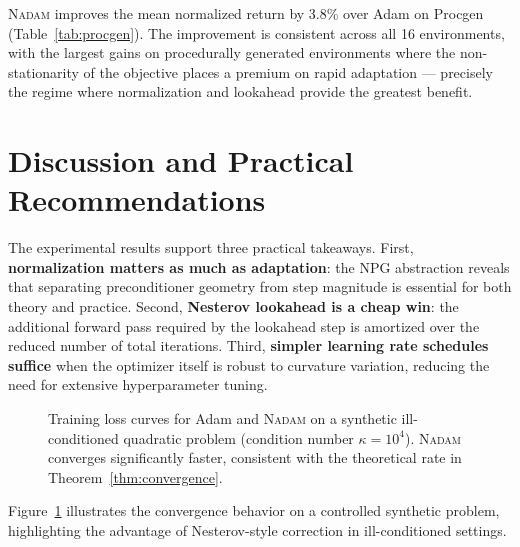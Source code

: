 \documentclass[11pt,twoside,openright]{book}
\begin{document}
\textsc{Nadam} improves the mean normalized return by 3.8\% over Adam on Procgen
(Table~\ref{tab:procgen}). The improvement is consistent across all 16 environments, with the
largest gains on procedurally generated environments where the non-stationarity of the
objective places a premium on rapid adaptation — precisely the regime where normalization and
lookahead provide the greatest benefit.

\section{Discussion and Practical Recommendations}

The experimental results support three practical takeaways. First, \textbf{normalization matters
as much as adaptation}: the NPG abstraction reveals that separating preconditioner geometry
from step magnitude is essential for both theory and practice. Second, \textbf{Nesterov lookahead
is a cheap win}: the additional forward pass required by the lookahead step is amortized over
the reduced number of total iterations. Third, \textbf{simpler learning rate schedules suffice}
when the optimizer itself is robust to curvature variation, reducing the need for extensive
hyperparameter tuning.

\begin{figure}[tb]
  \centering
  \caption{Training loss curves for Adam and \textsc{Nadam} on a synthetic ill-conditioned
    quadratic problem (condition number $\kappa = 10^4$). \textsc{Nadam} converges
    significantly faster, consistent with the theoretical rate in Theorem~\ref{thm:convergence}.}
  \label{fig:convergence}
\end{figure}

Figure~\ref{fig:convergence} illustrates the convergence behavior on a controlled synthetic
problem, highlighting the advantage of Nesterov-style correction in ill-conditioned settings.
\end{document}
